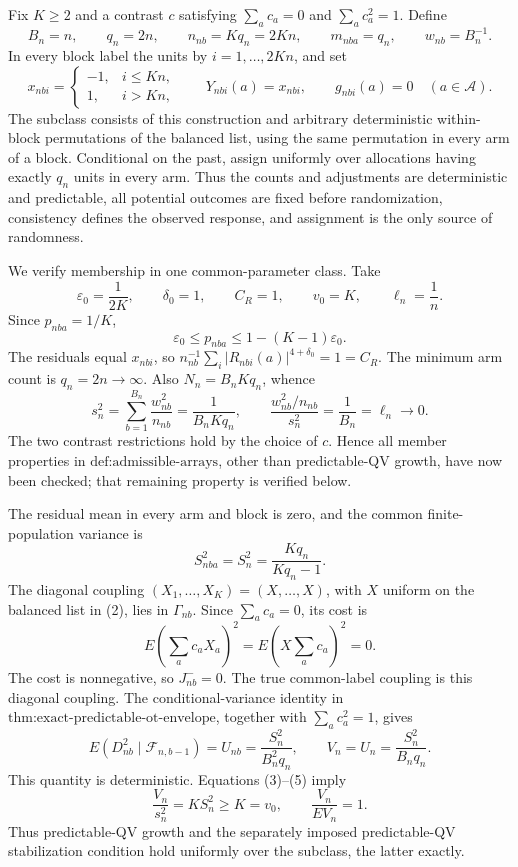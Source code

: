 Fix \(K\ge2\) and a contrast \(c\) satisfying \(\sum_ac_a=0\) and \(\sum_ac_a^2=1\). Define
\[
B_n=n,\qquad q_n=2n,\qquad n_{nb}=Kq_n=2Kn,
\qquad m_{nba}=q_n,\qquad w_{nb}=B_n^{-1}.
\tag{1}
\]
In every block label the units by \(i=1,\ldots,2Kn\), and set
\[
x_{nbi}=\begin{cases}-1,&i\le Kn,\\1,&i>Kn,\end{cases}
\qquad
Y_{nbi}(a)=x_{nbi},\qquad g_{nbi}(a)=0
\quad(a\in\mathcal A).
\tag{2}
\]
The subclass consists of this construction and arbitrary deterministic within-block permutations of the balanced list, using the same permutation in every arm of a block. Conditional on the past, assign uniformly over allocations having exactly \(q_n\) units in every arm. Thus the counts and adjustments are deterministic and predictable, all potential outcomes are fixed before randomization, consistency defines the observed response, and assignment is the only source of randomness.

We verify membership in one common-parameter class. Take
\[
\varepsilon_0=\frac1{2K},\qquad \delta_0=1,
\qquad C_R=1,\qquad v_0=K,\qquad \ell_n=\frac1n.
\]
Since \(p_{nba}=1/K\),
\[
\varepsilon_0\le p_{nba}\le1-(K-1)\varepsilon_0.
\]
The residuals equal \(x_{nbi}\), so
\(n_{nb}^{-1}\sum_i|R_{nbi}(a)|^{4+\delta_0}=1=C_R\). The minimum arm count is \(q_n=2n\to\infty\). Also \(N_n=B_nKq_n\), whence
\[
s_n^2=\sum_{b=1}^{B_n}\frac{w_{nb}^2}{n_{nb}}
=\frac1{B_nKq_n},
\qquad
\frac{w_{nb}^2/n_{nb}}{s_n^2}
=\frac1{B_n}=\ell_n\longrightarrow0.
\tag{3}
\]
The two contrast restrictions hold by the choice of \(c\). Hence all member properties in \(\text{def:admissible-arrays}\), other than predictable-QV growth, have now been checked; that remaining property is verified below.

The residual mean in every arm and block is zero, and the common finite-population variance is
\[
S_{nba}^2=S_n^2=\frac{Kq_n}{Kq_n-1}.
\tag{4}
\]
The diagonal coupling \((X_1,\ldots,X_K)=(X,\ldots,X)\), with \(X\) uniform on the balanced list in (2), lies in \(\Gamma_{nb}\). Since \(\sum_ac_a=0\), its cost is
\[
E\left(\sum_ac_aX_a\right)^2
=E\left(X\sum_ac_a\right)^2=0.
\]
The cost is nonnegative, so \(J_{nb}^{-}=0\). The true common-label coupling is this diagonal coupling. The conditional-variance identity in \(\text{thm:exact-predictable-ot-envelope}\), together with \(\sum_ac_a^2=1\), gives
\[
E(D_{nb}^2\mid\mathcal F_{n,b-1})
=U_{nb}=\frac{S_n^2}{B_n^2q_n},
\qquad
V_n=U_n=\frac{S_n^2}{B_nq_n}.
\tag{5}
\]
This quantity is deterministic. Equations (3)--(5) imply
\[
\frac{V_n}{s_n^2}=KS_n^2\ge K=v_0,
\qquad
\frac{V_n}{EV_n}=1.
\tag{6}
\]
Thus predictable-QV growth and the separately imposed predictable-QV stabilization condition hold uniformly over the subclass, the latter exactly.

